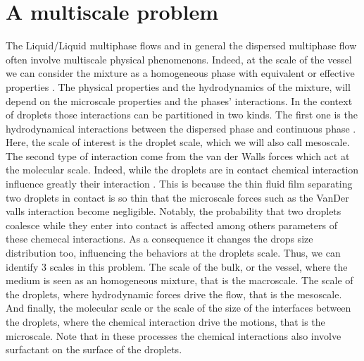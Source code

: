\section{A multiscale problem} 



The Liquid/Liquid multiphase flows and in general the dispersed multiphase flow often involve multiscale physical phenomenons. 
Indeed, at the scale of the vessel we can consider the mixture as a homogeneous phase with equivalent or effective properties \citet{jackson2000}.
The physical properties and the hydrodynamics of the mixture, will depend on the microscale properties and the phases' interactions.
In the context of droplets those interactions can be partitioned in two kinds. 
The first one is the hydrodynamical interactions between the dispersed phase and continuous phase \citet[Chapter 1]{guazzelli2011}.
Here, the scale of interest is the droplet scale, which we will also call mesoscale.
The second type of interaction come from the van der Walls forces which act at the molecular scale. 
Indeed, while the droplets are in contact chemical interaction influence greatly their interaction \citet{chesters1991modelling}.
This is because the thin fluid film separating two droplets in contact is so thin that the microscale forces such as the VanDer valls interaction become negligible. 
Notably, the probability that two droplets coalesce while they enter into contact is affected among others parameters of these chemecal interactions. 
As a consequence it changes the drops size distribution too, influencing the behaviors at the droplets scale.
Thus, we can identify $3$ scales in this problem.
The scale of the bulk, or the vessel, where the medium is seen as an homogeneous mixture, that is the macroscale. 
The scale of the droplets, where hydrodynamic forces drive the flow, that is the mesoscale. 
And finally, the molecular scale or the scale of the size of the interfaces between the droplets, where the chemical interaction drive the motions, that is the microscale. 
Note that in these processes the chemical interactions also involve surfactant on the surface of the droplets. 


